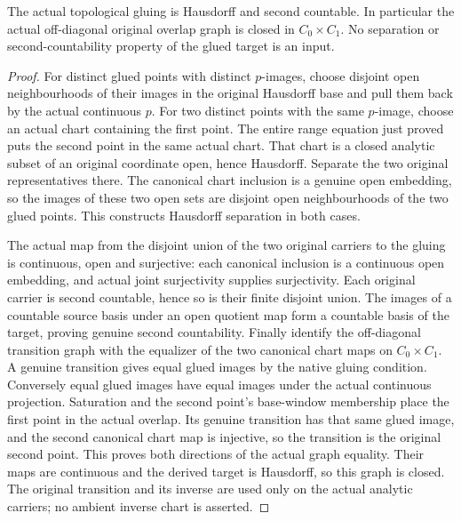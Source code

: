 \begin{theorem}
\label{hir:disjoint-analytic-saturated-glued-separation}
\leanok
The actual topological gluing is Hausdorff and second countable. In particular
the actual off-diagonal original overlap graph is closed in $C_0\times C_1$.
No separation or second-countability property of the glued target is an input.
\end{theorem}
\begin{proof}
For distinct glued points with distinct $p$-images, choose disjoint open
neighbourhoods of their images in the original Hausdorff base and pull them
back by the actual continuous $p$. For two distinct points with the same
$p$-image, choose an actual chart containing the first point. The entire
range equation just proved puts the second point in the same actual chart.
That chart is a closed analytic subset of an original coordinate open, hence
Hausdorff. Separate the two original representatives there. The canonical
chart inclusion is a genuine open embedding, so the images of these two
open sets are disjoint open neighbourhoods of the two glued points. This
constructs Hausdorff separation in both cases.

The actual map from the disjoint union of the two original carriers to the
gluing is continuous, open and surjective: each canonical inclusion is a
continuous open embedding, and actual joint surjectivity supplies surjectivity.
Each original carrier is second countable, hence so is their finite disjoint
union. The images of a countable source basis under an open quotient map
form a countable basis of the target, proving genuine second countability.
Finally identify the off-diagonal transition graph with the equalizer of the
two canonical chart maps on $C_0\times C_1$. A genuine transition gives equal
glued images by the native gluing condition. Conversely equal glued images
have equal images under the actual continuous projection. Saturation and
the second point's base-window membership place the first point in the
actual overlap. Its genuine transition has that same glued image, and the
second canonical chart map is injective, so the transition is the original
second point. This proves both directions of the actual graph equality. Their maps are continuous and the derived target is Hausdorff,
so this graph is closed. The original transition and its inverse are used
only on the actual analytic carriers; no ambient inverse chart is asserted.
\end{proof}

